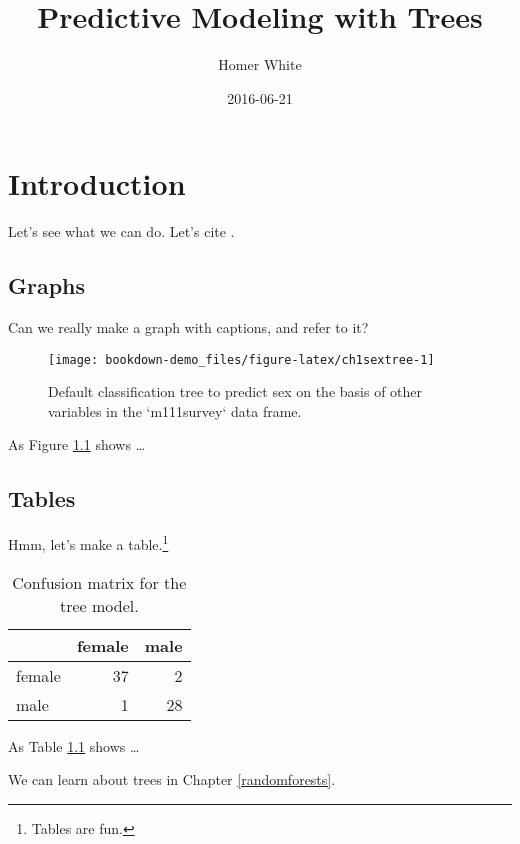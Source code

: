 \documentclass[]{book}
\title{Predictive Modeling with Trees}
\author{Homer White}
\date{2016-06-21}
\let\rmarkdownfootnote\footnote%
\def\footnote{\protect\rmarkdownfootnote}
\begin{document}
\maketitle

{
\setcounter{tocdepth}{1}
\tableofcontents
}
\chapter{Introduction}\label{introduction}

Let's see what we can do. Let's cite \citep{statlearn}.

\section{Graphs}\label{graphs}

Can we really make a graph with captions, and refer to it?

\begin{figure}

{\centering \texttt{[image: bookdown-demo\_files/figure-latex/ch1sextree-1]} 

}

\caption{Default classification tree to predict sex on the basis of other variables in the `m111survey` data frame.}\label{fig:ch1sextree}
\end{figure}

As Figure \ref{fig:ch1sextree} shows \ldots{}

\section{Tables}\label{tables}

Hmm, let's make a table.\footnote{Tables are fun.}

\begin{table}

\caption{\label{tab:ch1sexconfusion}Confusion matrix for the tree model.}
\centering
\begin{tabular}[t]{l|r|r}
\hline
  & female & male\\
\hline
female & 37 & 2\\
\hline
male & 1 & 28\\
\hline
\end{tabular}
\end{table}

As Table \ref{tab:ch1sexconfusion} shows \ldots{}

We can learn about trees in Chapter \ref{randomforests}.
\end{document}
